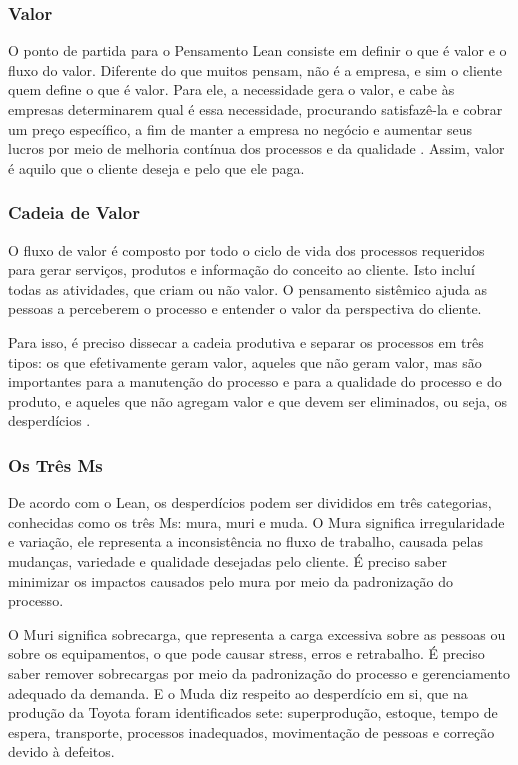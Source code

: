 \subsubsection[Valor]{Valor}

O ponto de partida para o Pensamento Lean consiste em definir o que é valor e o fluxo do valor. Diferente do que muitos pensam, não é a empresa, e sim o cliente quem define o que é valor. Para ele, a necessidade gera o valor, e cabe às empresas determinarem qual é essa necessidade, procurando satisfazê-la e cobrar um preço específico, a fim de manter a empresa no negócio e aumentar seus lucros por meio de melhoria contínua dos processos e da qualidade \cite{leaninstitute}. Assim, valor é aquilo que o cliente deseja e pelo que ele paga. 

\subsubsection[Cadeia de Valor]{Cadeia de Valor}

O fluxo de valor é composto por todo o ciclo de vida dos processos requeridos para gerar serviços, produtos e informação do conceito ao cliente.  Isto incluí todas as atividades, que criam ou não valor. O pensamento sistêmico ajuda as pessoas a perceberem o processo e entender o valor da perspectiva do cliente. 

Para isso, é preciso dissecar a cadeia produtiva e separar os processos em três tipos: os que efetivamente geram valor, aqueles que não geram valor, mas são importantes para a manutenção do processo e para a qualidade do processo e do produto, e aqueles que não agregam valor e que devem ser eliminados, ou seja, os desperdícios \cite{leaninstitute}.

\subsubsection[Os Três Ms]{Os Três Ms}

De acordo com o Lean, os desperdícios podem ser divididos em três categorias, conhecidas como os três Ms: mura, muri e muda. O Mura significa irregularidade e variação, ele representa a inconsistência no fluxo de trabalho, causada pelas mudanças, variedade e qualidade desejadas pelo cliente. É preciso saber minimizar os impactos causados pelo mura por meio da padronização do processo. 

O Muri significa sobrecarga, que representa a carga excessiva sobre as pessoas ou sobre os equipamentos, o que pode causar stress, erros e retrabalho. É preciso saber remover sobrecargas por meio da padronização do processo e gerenciamento adequado da demanda. E o Muda diz respeito ao desperdício em si, que na produção da Toyota foram identificados sete: superprodução, estoque, tempo de espera, transporte, processos inadequados, movimentação de pessoas e correção devido à defeitos.

